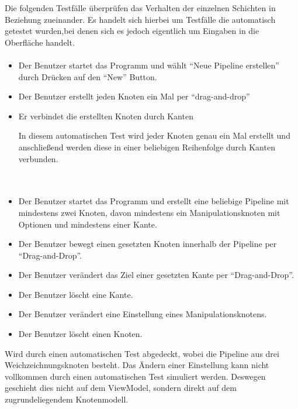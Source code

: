 Die folgenden Testfälle überprüfen das Verhalten der einzelnen Schichten in Beziehung zueinander. Es handelt sich hierbei um Testfälle die automatisch getestet wurden,bei denen sich es jedoch eigentlich um Eingaben in die Oberfläche handelt.

\paragraph{}
\begin{itemize}
	\item Der Benutzer startet das Programm und wählt ``Neue Pipeline erstellen'' durch Drücken auf den ``New'' Button.
	\item Der Benutzer erstellt jeden Knoten ein Mal per ``drag-and-drop''
	\item Er verbindet die erstellten Knoten durch Kanten
	
	In diesem automatischen Test wird jeder Knoten genau ein Mal erstellt und anschließend werden diese in einer beliebigen Reihenfolge durch Kanten verbunden.
\end{itemize}

\paragraph{} ~\\

\begin{itemize}
	\item Der Benutzer startet das Programm und erstellt eine beliebige Pipeline mit mindestens zwei Knoten, davon mindestens ein Manipulationsknoten mit Optionen und mindestens einer Kante.
			\item Der Benutzer bewegt einen gesetzten Knoten innerhalb der Pipeline per ``Drag-and-Drop''.
			\item Der Benutzer verändert das Ziel einer gesetzten Kante per ``Drag-and-Drop''.
			\item Der Benutzer löscht eine Kante.
			\item Der Benutzer verändert eine Einstellung eines Manipulationsknotens.
			\item Der Benutzer löscht einen Knoten.
\end{itemize}

Wird durch einen automatischen Test abgedeckt, wobei die Pipeline aus drei Weichzeichnungsknoten besteht. Das Ändern einer Einstellung kann nicht vollkommen durch einen automatischen Test simuliert werden. Deswegen geschieht dies nicht auf dem ViewModel, sondern direkt auf dem zugrundeliegendem Knotenmodell.


